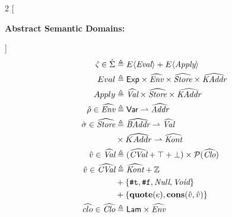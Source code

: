 \documentclass[12pt,draft]{article}
\newcommand{\truesyn}{\texttt{\#t}}
\newcommand{\falsesyn}{\texttt{\#f}}
\begin{document}
\begin{multicols*}{2}
  [
  \begin{center}
    \textbf{Abstract Semantic Domains:}
  \end{center}
  \vspace{-15mm}
  ]
  \begin{align*}
    \vspace{-10mm}
    \hat{\varsigma} \in \hat{\Sigma}
    &\triangleq E\langle \textit{Eval} \rangle + E\langle \textit{Apply} \rangle\\
    Eval &\triangleq \textsf{Exp}
           \times \widehat{\textit{Env}}
           \times \widehat{\textit{Store}}
           \times \widehat{\textit{KAddr}} \\
    Apply &\triangleq \widehat{\textit{Val}}
            \times \widehat{\textit{Store}} \times \widehat{\textit{KAddr}} \\
    \aenv \in \widehat{\textit{Env}}
    &\triangleq \textsf{Var} \rightharpoonup \widehat{\textit{Addr}} \\
    \astore \in \widehat{\textit{Store}}
    &\triangleq \widehat{\textit{BAddr}} \rightharpoonup \widehat{\textit{Val}} \\
    &\times \widehat{KAddr} \rightharpoonup \widehat{\textit{Kont}} \\
    \aval \in \widehat{\textit{Val}} &\triangleq
                                       (\widehat{\textit{CVal}} + \top + \bot)
                                       \times \mathcal{P}(\widehat{\textit{Clo}}) \\
    \aval \in \widehat{\textit{CVal}}
    &\triangleq \widehat{\textit{Kont}} + \mathbb{Z} \\
    &+ \{\truesyn , \falsesyn , \textit{Null} , \textit{Void}\} \\
    &+ \{\textbf{quote}(e) , \textbf{cons}(\aval, \aval)\} \\
    \aclo \in \widehat{\textit{Clo}}
    &\triangleq \textsf{Lam} \times \widehat{\textit{Env}} \\

\end{align*}
\end{multicols*}
\end{document}
